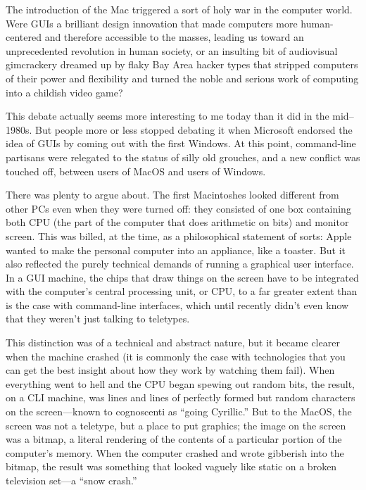 \documentclass[
  fontsize=11pt,
  paper=landscape,
  twocolumn=true,
  pagesize=pdftex,
  headings=small,
  DIV=15,
  ]{scrartcl}
\begin{document}
The introduction of the Mac triggered a sort of holy war in the computer
world. Were GUIs a brilliant design innovation that made computers more
human-centered and therefore accessible to the masses, leading us toward
an unprecedented revolution in human society, or an insulting bit of
audiovisual gimcrackery dreamed up by flaky Bay Area hacker types that
stripped computers of their power and flexibility and turned the noble
and serious work of computing into a childish video game?

This debate actually seems more interesting to me today than it did in
the mid--1980s. But people more or less stopped debating it when
Microsoft endorsed the idea of GUIs by coming out with the first
Windows. At this point, command-line partisans were relegated to the
status of silly old grouches, and a new conflict was touched off,
between users of MacOS and users of Windows.

There was plenty to argue about. The first Macintoshes looked different
from other PCs even when they were turned off: they consisted of one box
containing both CPU (the part of the computer that does arithmetic on
bits) and monitor screen. This was billed, at the time, as a
philosophical statement of sorts: Apple wanted to make the personal
computer into an appliance, like a toaster. But it also reflected the
purely technical demands of running a graphical user interface. In a GUI
machine, the chips that draw things on the screen have to be integrated
with the computer's central processing unit, or CPU, to a far greater
extent than is the case with command-line interfaces, which until
recently didn't even know that they weren't just talking to teletypes.

This distinction was of a technical and abstract nature, but it became
clearer when the machine crashed (it is commonly the case with
technologies that you can get the best insight about how they work by
watching them fail). When everything went to hell and the CPU began
spewing out random bits, the result, on a CLI machine, was lines and
lines of perfectly formed but random characters on the screen---known to
cognoscenti as ``going Cyrillic.'' But to the MacOS, the screen was not
a teletype, but a place to put graphics; the image on the screen was a
bitmap, a literal rendering of the contents of a particular portion of
the computer's memory. When the computer crashed and wrote gibberish
into the bitmap, the result was something that looked vaguely like
static on a broken television set---a ``snow crash.''
\end{document}
